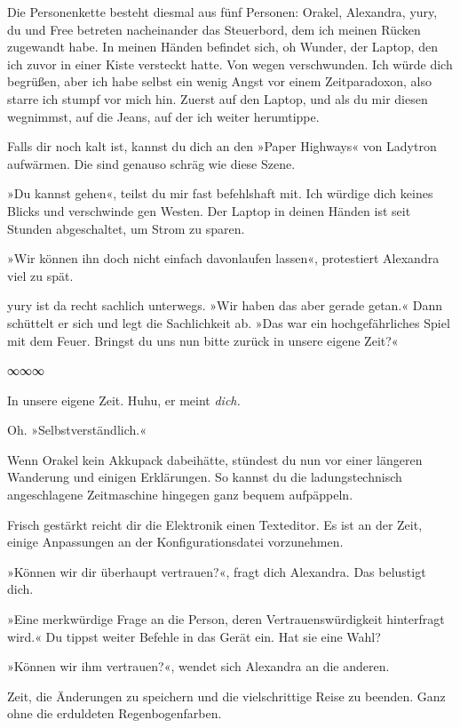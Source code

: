 Die Personenkette besteht diesmal aus fünf Personen: Orakel, Alexandra, yury, du und Free betreten nacheinander das Steuerbord, dem ich meinen Rücken zugewandt habe. In meinen Händen befindet sich, oh Wunder, der Laptop, den ich zuvor in einer Kiste versteckt hatte. Von wegen verschwunden. Ich würde dich begrüßen, aber ich habe selbst ein wenig Angst vor einem Zeitparadoxon, also starre ich stumpf vor mich hin. Zuerst auf den Laptop, und als du mir diesen wegnimmst, auf die Jeans, auf der ich weiter herumtippe.

Falls dir noch kalt ist, kannst du dich an den »Paper Highways« von Ladytron aufwärmen. Die sind genauso schräg wie diese Szene.

»Du kannst gehen«, teilst du mir fast befehlshaft mit. Ich würdige dich keines Blicks und verschwinde gen Westen. Der Laptop in deinen Händen ist seit Stunden abgeschaltet, um Strom zu sparen.

»Wir können ihn doch nicht einfach davonlaufen lassen«, protestiert Alexandra viel zu spät.

yury ist da recht sachlich unterwegs. »Wir haben das aber gerade getan.« Dann schüttelt er sich und legt die Sachlichkeit ab. »Das war ein hochgefährliches Spiel mit dem Feuer. Bringst du uns nun bitte zurück in unsere eigene Zeit?«

\begin{center}
∞∞∞
\end{center}

In unsere eigene Zeit. Huhu, er meint \emph{dich.}

Oh. »Selbstverständlich.«

Wenn Orakel kein Akkupack dabeihätte, stündest du nun vor einer längeren Wanderung und einigen Erklärungen. So kannst du die ladungstechnisch angeschlagene Zeitmaschine hingegen ganz bequem aufpäppeln.

Frisch gestärkt reicht dir die Elektronik einen Texteditor. Es ist an der Zeit, einige Anpassungen an der Konfigurationsdatei vorzunehmen.

»Können wir dir überhaupt vertrauen?«, fragt dich Alexandra. Das belustigt dich.

»Eine merkwürdige Frage an die Person, deren Vertrauenswürdigkeit hinterfragt wird.« Du tippst weiter Befehle in das Gerät ein. Hat sie eine Wahl?

»Können wir ihm vertrauen?«, wendet sich Alexandra an die anderen.

Zeit, die Änderungen zu speichern und die vielschrittige Reise zu beenden. Ganz ohne die erduldeten Regenbogenfarben.

